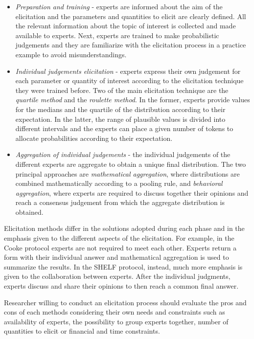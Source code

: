 \documentclass[graybox]{svmult}
\begin{document}
\begin{itemize}
	\item{\emph{Preparation and training} - experts are informed about  the aim of the elicitation and the parameters and quantities to elicit are clearly defined. All the relevant information about the topic of interest is collected and made available to experts. Next, experts are trained to make probabilistic judgements and they are familiarize with the elicitation process in a practice example to avoid misunderstandings. }
	\item{\emph{Individual judgements elicitation} - experts express their own judgement for each parameter or quantity of interest according to the elicitation technique they were trained before. Two of the main elicitation technique are the \emph{quartile method} and the \emph{roulette method}. In the former, experts provide values for the medians  and the quartile of the distribution according to their expectation. In the latter, the range of plausible values is divided into different intervals and the experts can place a given number of tokens to allocate probabilities according to  their expectation.}
	\item{\emph{Aggregation of individual judgements} - the individual judgements of the different experts are aggregate to obtain a unique final distribution. The two principal approaches are \emph{mathematical  aggregation}, where distributions are combined mathematically according to a pooling rule, and \emph{behavioral aggregation}, where experts are required to discuss together their opinions and reach a consensus judgement from which the aggregate distribution is obtained.}
\end{itemize}

Elicitation methods differ in the solutions adopted during each phase and in the emphasis given to the different aspects of the elicitation. For example, in the Cooke protocol experts are not required to meet each other. Experts return a form with their individual answer and mathematical aggregation is used to summarize the results. In the SHELF protocol, instead, much more emphasis is given to the collaboration between experts. After the  individual judgments, experts discuss and share their opinions to then reach a common final answer.

Researcher willing to conduct an elicitation process should evaluate the pros and cons of each methods considering their own needs and constraints such as availability of experts, the possibility to group experts together, number of quantities to elicit or financial and time constraints. 
\end{document}
